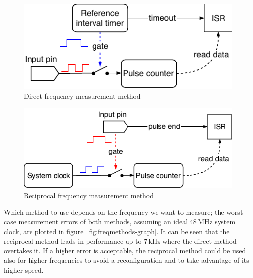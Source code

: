 \begin{figure}[h]
	\centering
	\includegraphics[scale=1] {img/fcap-direct.pdf}
	\caption{\label{fig:fcap-direct-dia}Direct frequency measurement method}
\end{figure}

\begin{figure}[h]
\centering
\includegraphics[scale=1] {img/fcap-reciprocal.pdf}
\caption{\label{fig:fcap-reci-dia}Reciprocal frequency measurement method}
\end{figure}

Which method to use depends on the frequency we want to measure; the worst-case measurement errors of both methods, assuming an ideal 48\,MHz system clock, are plotted in figure~\ref{fig:freqmethods-graph}. It can be seen that the reciprocal method leads in performance up to 7\,kHz where the direct method overtakes it. If a higher error is acceptable, the reciprocal method could be used also for higher frequencies to avoid a reconfiguration and to take advantage of its higher speed.

